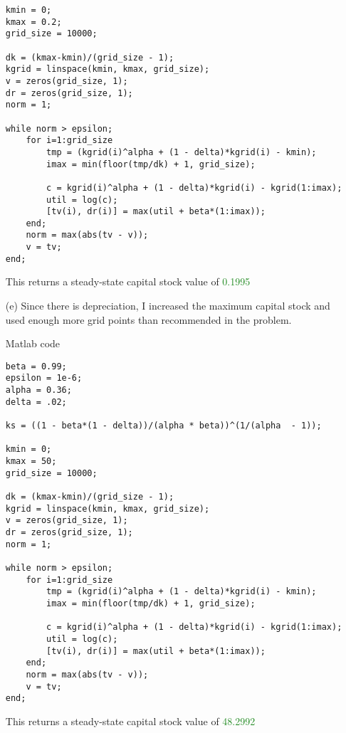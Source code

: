 \documentclass[11pt]{article}
\newcommand{\gr}{\textcolor{ForestGreen}}
\begin{document}
\begin{enumerate}[label=(\alph*)]
\begin{verbatim}
kmin = 0;
kmax = 0.2;
grid_size = 10000;

dk = (kmax-kmin)/(grid_size - 1);
kgrid = linspace(kmin, kmax, grid_size);
v = zeros(grid_size, 1);
dr = zeros(grid_size, 1);
norm = 1;

while norm > epsilon;
    for i=1:grid_size
        tmp = (kgrid(i)^alpha + (1 - delta)*kgrid(i) - kmin);
        imax = min(floor(tmp/dk) + 1, grid_size);
        
        c = kgrid(i)^alpha + (1 - delta)*kgrid(i) - kgrid(1:imax);
        util = log(c);
        [tv(i), dr(i)] = max(util + beta*(1:imax));
    end;
    norm = max(abs(tv - v));
    v = tv;
end;
\end{verbatim}
This returns a steady-state capital stock value of \gr{0.1995}

\newpage
\item[(e)] Since there is depreciation, I increased the maximum capital stock and used enough more grid points than recommended in the problem.

Matlab code 
\begin{verbatim}
beta = 0.99;
epsilon = 1e-6;
alpha = 0.36;
delta = .02;

ks = ((1 - beta*(1 - delta))/(alpha * beta))^(1/(alpha  - 1));

kmin = 0;
kmax = 50;
grid_size = 10000;

dk = (kmax-kmin)/(grid_size - 1);
kgrid = linspace(kmin, kmax, grid_size);
v = zeros(grid_size, 1);
dr = zeros(grid_size, 1);
norm = 1;

while norm > epsilon;
    for i=1:grid_size
        tmp = (kgrid(i)^alpha + (1 - delta)*kgrid(i) - kmin);
        imax = min(floor(tmp/dk) + 1, grid_size);
        
        c = kgrid(i)^alpha + (1 - delta)*kgrid(i) - kgrid(1:imax);
        util = log(c);
        [tv(i), dr(i)] = max(util + beta*(1:imax));
    end;
    norm = max(abs(tv - v));
    v = tv;
end;\end{verbatim}
This returns a steady-state capital stock value of \gr{48.2992}
\end{enumerate}

\newpage
\end{document}
